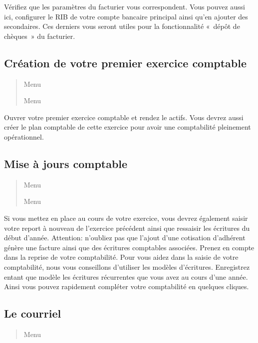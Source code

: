 \documentclass[a4paper,10pt,oneside,french]{sphinxmanual}
\begin{document}
Vérifiez que les paramètres du facturier vous correspondent.
Vous pouvez aussi ici, configurer le RIB de votre compte bancaire principal ainsi qu’en ajouter des secondaires.
Ces derniers vous seront utiles pour la fonctionnalité « dépôt de chèques » du facturier.


\subsection{Création de votre premier exercice comptable}
\label{\detokenize{pro/first_step:creation-de-votre-premier-exercice-comptable}}\begin{quote}

Menu 

Menu 
\end{quote}

Ouvrer votre premier exercice comptable et rendez le actifs.
Vous devrez aussi créer le plan comptable de cette exercice pour avoir une comptabilité pleinement opérationnel.


\subsection{Mise à jours comptable}
\label{\detokenize{pro/first_step:mise-a-jours-comptable}}\begin{quote}

Menu 

Menu 
\end{quote}

Si vous mettez en place  au cours de votre exercice, vous devrez également saisir votre report à nouveau de l’exercice précédent ainsi que ressaisir les écritures du début d’année.
Attention: n’oubliez pas que l’ajout d’une cotisation d’adhérent génère une facture ainsi que des écritures comptables associées. Prenez en compte dans la reprise de votre comptabilité.
Pour vous aidez dans la saisie de votre comptabilité, nous vous conseillons d’utiliser les modèles d’écritures. Enregistrez entant que modèle les écritures récurrentes que vous avez au cours d’une année. Ainsi vous pouvez rapidement compléter votre comptabilité en quelques cliques.


\subsection{Le courriel}
\label{\detokenize{pro/first_step:le-courriel}}\begin{quote}

Menu 
\end{quote}
\end{document}
